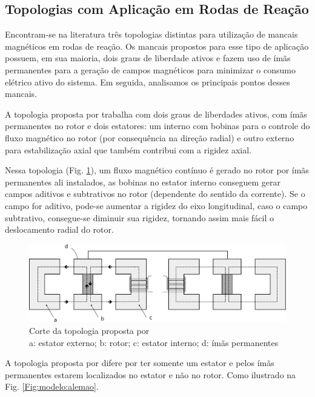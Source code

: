 \subsection{Topologias com Aplicação em Rodas de Reação}

Encontram-se na literatura três topologias distintas para utilização de mancais magnéticos em rodas de reação. Os mancais propostos para esse tipo de aplicação possuem, em sua maioria, dois graus de liberdade ativos e fazem uso de ímãs permanentes para a geração de campos magnéticos para minimizar o consumo elétrico ativo do sistema. Em seguida, analisamos os principais pontos desses mancais.

A topologia proposta por \citet{Bernus1998} trabalha com dois graus de liberdades ativos, com ímãs permanentes no rotor e dois estatores: um interno com bobinas para o controle do fluxo magnético no rotor (por consequência na direção radial) e outro externo para estabilização axial que também contribui com a rigidez axial. 

Nessa topologia (Fig. \ref{Fig:modelo:frances}), um fluxo magnético contínuo é gerado no rotor por ímãs permanentes ali instalados, as bobinas no estator interno conseguem gerar campos aditivos e subtrativos no rotor (dependente do sentido da corrente). Se o campo for aditivo, pode-se aumentar a rigidez do eixo longitudinal, caso o campo subtrativo, consegue-se diminuir sua rigidez, tornando assim mais fácil o deslocamento radial do rotor.

\begin{figure}[!ht]
	\centering
	\includegraphics[width=1\linewidth]{./Figs/mancais/frances}
	\caption{Corte da topologia proposta por \cite{Bernus1998} \\
	a: estator externo; b: rotor; c: estator interno; d: ímãs permanentes}
	\label{Fig:modelo:frances}
\end{figure}

A topologia proposta por \citet{Scharfe2001} difere por ter somente um estator e pelos ímãs permanentes estarem localizados no estator e não no rotor. Como ilustrado na Fig. \ref{Fig:modelo:alemao}. 

